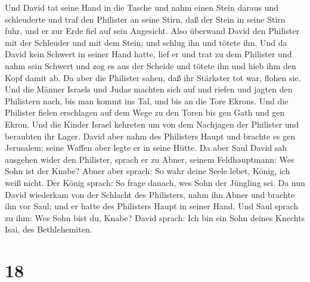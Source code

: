  Und David tat seine Hand in die Tasche und nahm einen
Stein daraus und schleuderte und traf den Philister an seine Stirn, daß
der Stein in seine Stirn fuhr, und er zur Erde fiel auf sein Angesicht.
 Also überwand David den Philister mit der Schleuder und
mit dem Stein; und schlug ihn und tötete ihn. Und da David kein Schwert
in seiner Hand hatte,  lief er und trat zu dem Philister
und nahm sein Schwert und zog es aus der Scheide und tötete ihn und hieb
ihm den Kopf damit ab. Da aber die Philister sahen, daß ihr Stärkster
tot war, flohen sie.  Und die Männer Israels und Judas
machten sich auf und riefen und jagten den Philistern nach, bis man
kommt ins Tal, und bis an die Tore Ekrons. Und die Philister fielen
erschlagen auf dem Wege zu den Toren bis gen Gath und gen Ekron.
 Und die Kinder Israel kehreten um von dem Nachjagen der
Philister und beraubten ihr Lager.  David aber nahm des
Philisters Haupt und brachte es gen Jerusalem; seine Waffen aber legte
er in seine Hütte.  Da aber Saul David sah ausgehen wider
den Philister, sprach er zu Abner, seinem Feldhauptmann: Wes Sohn ist
der Knabe? Abner aber sprach: So wahr deine Seele lebet, König, ich weiß
nicht.  Der König sprach: So frage danach, wes Sohn der
Jüngling sei.  Da nun David wiederkam von der Schlacht des
Philisters, nahm ihn Abner und brachte ihn vor Saul; und er hatte des
Philisters Haupt in seiner Hand.  Und Saul sprach zu ihm:
Wes Sohn bist du, Knabe? David sprach: Ich bin ein Sohn deines Knechts
Isai, des Bethlehemiten.

\hypertarget{section-17}{%
\section{18}\label{section-17}}

